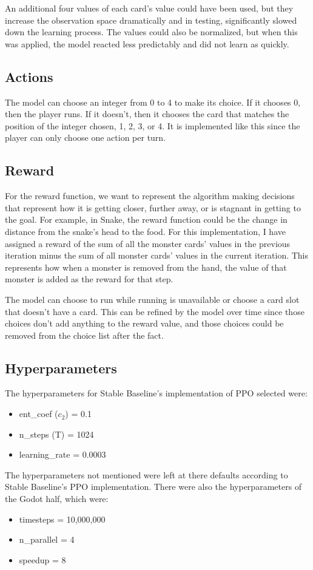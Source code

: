 \documentclass{article}
\begin{document}
An additional four values of each card's value could have been used, but they increase the observation space dramatically and in testing, significantly slowed down the learning process. The values could also be normalized, but when this was applied, the model reacted less predictably and did not learn as quickly.

\subsection{Actions}
The model can choose an integer from 0 to 4 to make its choice. If it chooses 0, then the player runs. If it doesn't, then it chooses the card that matches the position of the integer chosen, 1, 2, 3, or 4. It is implemented like this since the player can only choose one action per turn.

\subsection{Reward}
For the reward function, we want to represent the algorithm making decisions that represent how it is getting closer, further away, or is stagnant in getting to the goal. For example, in Snake, the reward function could be the change in distance from the snake's head to the food. For this implementation, I have assigned a reward of the sum of all the monster cards' values in the previous iteration minus the sum of all monster cards' values in the current iteration. This represents how when a monster is removed from the hand, the value of that monster is added as the reward for that step.

The model can choose to run while running is unavailable or choose a card slot that doesn't have a card. This can be refined by the model over time since those choices don't add anything to the reward value, and those choices could be removed from the choice list after the fact.

\subsection{Hyperparameters}
The hyperparameters for Stable Baseline's implementation of PPO selected were:
\begin{itemize}
  \item ent\_coef ($c_2$) = 0.1
  \item n\_steps (T) = 1024
  \item learning\_rate = 0.0003
\end{itemize}
The hyperparameters not mentioned were left at there defaults according to Stable Baseline's PPO implementation. There were also the hyperparameters of the Godot half, which were:
\begin{itemize}
  \item timesteps = 10,000,000
  \item n\_parallel = 4
  \item speedup = 8
\end{itemize}
\end{document}
